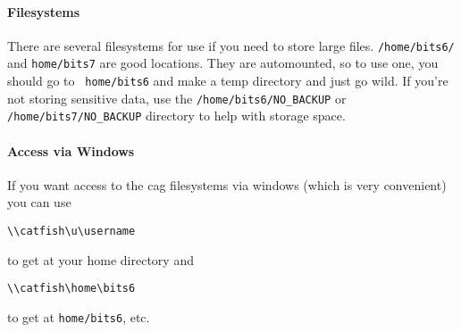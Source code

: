 \paragraph{Filesystems}
There are several filesystems for use if you need to store large
files.  {\tt /home/bits6/} and {\tt home/bits7} are good
locations. They are automounted, so to use one, you should go to {\tt
home/bits6} and make a temp directory and just go wild.  If you're not
storing sensitive data, use the {\tt /home/bits6/NO\_BACKUP} or {\tt
/home/bits7/NO\_BACKUP} directory to help with storage space.

\paragraph{Access via Windows}
If you want access to the cag filesystems via windows
(which is very convenient) you can use
\begin{verbatim}
\\catfish\u\username
\end{verbatim}
to get at your home directory and 
\begin{verbatim}
\\catfish\home\bits6
\end{verbatim}
 to get at {\tt home/bits6}, etc.

